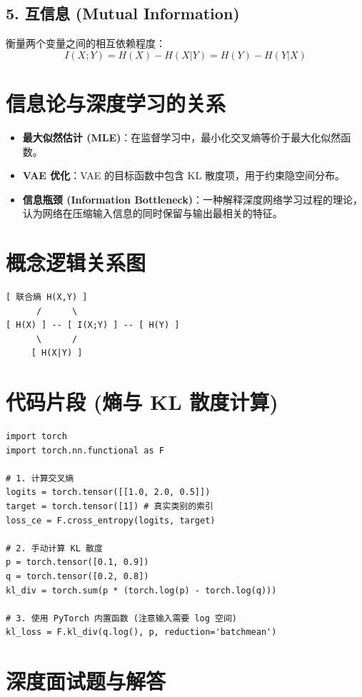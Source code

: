 \documentclass[12pt, a4paper]{book}
\begin{document}
\subsection{5. 互信息 (Mutual Information)}
衡量两个变量之间的相互依赖程度：
$$ I(X; Y) = H(X) - H(X|Y) = H(Y) - H(Y|X) $$

\section{信息论与深度学习的关系}
\begin{itemize}
    \item \textbf{最大似然估计 (MLE)}：在监督学习中，最小化交叉熵等价于最大化似然函数。
    \item \textbf{VAE 优化}：VAE 的目标函数中包含 KL 散度项，用于约束隐空间分布。
    \item \textbf{信息瓶颈 (Information Bottleneck)}：一种解释深度网络学习过程的理论，认为网络在压缩输入信息的同时保留与输出最相关的特征。
\end{itemize}

\section{概念逻辑关系图}
\begin{verbatim}
[ 联合熵 H(X,Y) ]
      /      \
[ H(X) ] -- [ I(X;Y) ] -- [ H(Y) ]
      \      /
     [ H(X|Y) ]
\end{verbatim}

\section{代码片段 (熵与 KL 散度计算)}
\begin{lstlisting}
import torch
import torch.nn.functional as F

# 1. 计算交叉熵
logits = torch.tensor([[1.0, 2.0, 0.5]])
target = torch.tensor([1]) # 真实类别的索引
loss_ce = F.cross_entropy(logits, target)

# 2. 手动计算 KL 散度
p = torch.tensor([0.1, 0.9])
q = torch.tensor([0.2, 0.8])
kl_div = torch.sum(p * (torch.log(p) - torch.log(q)))

# 3. 使用 PyTorch 内置函数 (注意输入需要 log 空间)
kl_loss = F.kl_div(q.log(), p, reduction='batchmean')
\end{lstlisting}

\section{深度面试题与解答}
\end{document}
